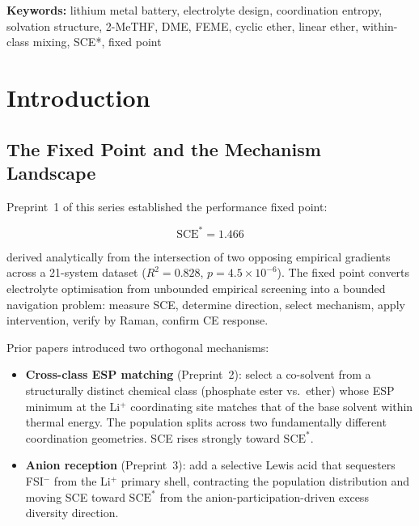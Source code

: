 \documentclass[11pt]{article}
\theoremstyle{plain}
\theoremstyle{definition}
\theoremstyle{remark}
\begin{document}
\vspace{1em}
\noindent\textbf{Keywords:} lithium metal battery, electrolyte design,
coordination entropy, solvation structure, 2-MeTHF, DME, FEME,
cyclic ether, linear ether, within-class mixing, SCE*, fixed point

\tableofcontents
\newpage

\section{Introduction}

\subsection{The Fixed Point and the Mechanism Landscape}

Preprint~1 of this series established the performance fixed point:

\begin{equation}
  \mathrm{SCE}^{*} = 1.466
  \label{eq:fixed_point}
\end{equation}

derived analytically from the intersection of two opposing empirical
gradients across a 21-system dataset ($R^2 = 0.828$,
$p = 4.5 \times 10^{-6}$).  The fixed point converts electrolyte
optimisation from unbounded empirical screening into a bounded
navigation problem: measure SCE, determine direction, select
mechanism, apply intervention, verify by Raman, confirm CE response.

Prior papers introduced two orthogonal mechanisms:

\begin{itemize}[leftmargin=2em]
  \item \textbf{Cross-class ESP matching} (Preprint~2): select a
        co-solvent from a structurally distinct chemical class
        (phosphate ester vs.\ ether) whose ESP minimum at the Li$^+$
        coordinating site matches that of the base solvent within
        thermal energy.  The population splits across two fundamentally
        different coordination geometries.  SCE rises strongly toward
        $\mathrm{SCE}^{*}$.
  \item \textbf{Anion reception} (Preprint~3): add a selective Lewis
        acid that sequesters FSI$^-$ from the Li$^+$ primary shell,
        contracting the population distribution and moving SCE toward
        $\mathrm{SCE}^{*}$ from the anion-participation-driven excess
        diversity direction.
\end{itemize}
\end{document}
